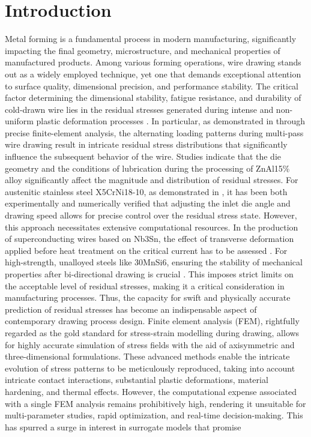 \documentclass[pdflatex,sn-basic,Numbered]{sn-jnl}
\begin{document}
\section{Introduction}

Metal forming is a fundamental process in modern manufacturing, significantly impacting the final geometry, microstructure, and mechanical properties of manufactured products. Among various forming operations, wire drawing stands out as a widely employed technique, yet one that demands exceptional attention to surface quality, dimensional precision, and performance stability.
The critical factor determining the dimensional stability, fatigue resistance, and durability of cold-drawn wire lies in the residual stresses generated during intense and non-uniform plastic deformation processes \citep{burioli2024novel,lim2026study,shin2026accurate,delrey2025effect,delrey2026advances,he2003residual,overstam2006influence,aghdami2020inverse,radionova2022fem, selbmann2024residual, suliga2024influence, ruminski2025effect}. In particular, as demonstrated in \citep{shin2026accurate} through precise finite-element analysis, the alternating loading patterns during multi-pass wire drawing result in intricate residual stress distributions that significantly influence the subsequent behavior of the wire. Studies \citep{delrey2025effect, delrey2026advances} indicate that the die geometry and the conditions of lubrication during the processing of ZnAl15\% alloy significantly affect the magnitude and distribution of residual stresses. For austenitic stainless steel X5CrNi18-10, as demonstrated in \citep{selbmann2024residual}, it has been both experimentally and numerically verified that adjusting the inlet die angle and drawing speed allows for precise control over the residual stress state. However, this approach necessitates extensive computational resources. In the production of superconducting wires based on Nb3Sn, the effect of transverse deformation applied before heat treatment on the critical current has to be assessed \citep{burioli2024novel}. For high-strength, unalloyed steels like 30MnSi6, ensuring the stability of mechanical properties after bi-directional drawing is crucial \citep{lim2026study}. This imposes strict limits on the acceptable level of residual stresses, making it a critical consideration in manufacturing processes. Thus, the capacity for swift and physically accurate prediction of residual stresses has become an indispensable aspect of contemporary drawing process design. Finite element analysis (FEM), rightfully regarded as the gold standard for stress-strain modelling during drawing, allows for highly accurate simulation of stress fields with the aid of axisymmetric and three-dimensional formulations. These advanced methods enable the intricate evolution of stress patterns to be meticulously reproduced, taking into account intricate contact interactions, substantial plastic deformations, material hardening, and thermal effects. However, the computational expense associated with a single FEM analysis remains prohibitively high, rendering it unsuitable for multi-parameter studies, rapid optimization, and real-time decision-making. This has spurred a surge in interest in surrogate models that promise 
\end{document}
